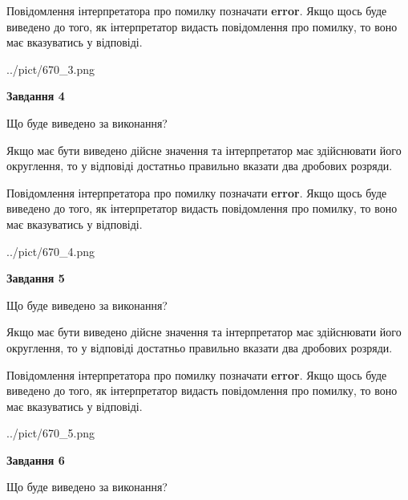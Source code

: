 \documentclass[12pt, ukrainian]{article}
\begin{document}
{\begin {Large}
Повідомлення інтерпретатора про помилку позначати \textbf{error}.
Якщо щось буде виведено до того, як інтерпретатор видасть повідомлення про помилку, 
то воно має вказуватись у відповіді. \par

\begin{center}
	{../pict/670_3.png}
\end{center}
\newpage

{\begin {center}\textbf{Завдання 4}\end {center}}\par
Що буде виведено за виконання? \par

Якщо має бути виведено дійсне значення та інтерпретатор має здійснювати його округлення, 
то у відповіді достатньо правильно вказати два дробових розряди.

Повідомлення інтерпретатора про помилку позначати \textbf{error}.
Якщо щось буде виведено до того, як інтерпретатор видасть повідомлення про помилку, 
то воно має вказуватись у відповіді. \par

\begin{center}
	{../pict/670_4.png}
\end{center}
\newpage

{\begin {center}\textbf{Завдання 5}\end {center}}\par
Що буде виведено за виконання? \par

Якщо має бути виведено дійсне значення та інтерпретатор має здійснювати його округлення, 
то у відповіді достатньо правильно вказати два дробових розряди.

Повідомлення інтерпретатора про помилку позначати \textbf{error}.
Якщо щось буде виведено до того, як інтерпретатор видасть повідомлення про помилку, 
то воно має вказуватись у відповіді. \par

\begin{center}
	{../pict/670_5.png}
\end{center}
\newpage

{\begin {center}\textbf{Завдання 6}\end {center}}\par
Що буде виведено за виконання? \par


\end{Large}}
\end{document}

